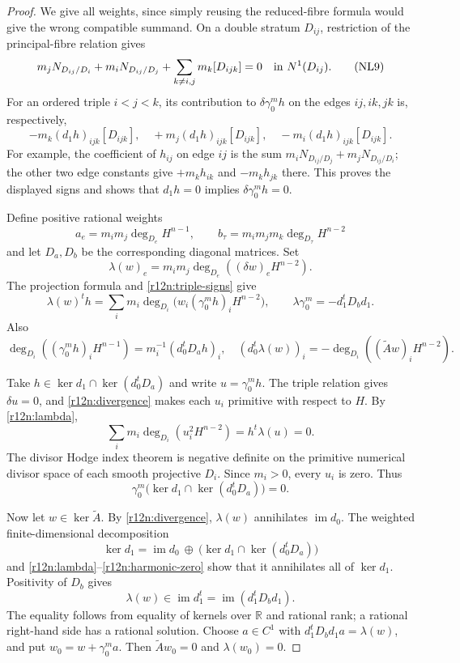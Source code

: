\begin{proof}
We give all weights, since simply reusing the reduced-fibre formula
would give the wrong compatible summand.  On a double stratum $D_{ij}$,
restriction of the principal-fibre relation gives
\[
 m_jN_{D_{ij}/D_i}+m_iN_{D_{ij}/D_j}
                  +\sum_{k\ne i,j}m_k[D_{ijk}]=0
                  \quad\hbox{in }N^1(D_{ij}).
\tag{NL9}\label{r12n:double-normal}
\]
For an ordered triple $i<j<k$, its contribution to
$\delta\gamma_0^m h$ on the edges $ij,ik,jk$ is, respectively,
\[
        -m_k(d_1h)_{ijk}[D_{ijk}],\quad
        +m_j(d_1h)_{ijk}[D_{ijk}],\quad
        -m_i(d_1h)_{ijk}[D_{ijk}].
\tag{NL10}\label{r12n:triple-signs}
\]
For example, the coefficient of $h_{ij}$ on edge $ij$ is the sum
$m_iN_{D_{ij}/D_j}+m_jN_{D_{ij}/D_i}$; the other two edge constants
give $+m_kh_{ik}$ and $-m_kh_{jk}$ there.  This proves the displayed
signs and shows that $d_1h=0$ implies $\delta\gamma_0^m h=0$.

Define positive rational weights
\[
 a_e=m_im_j\deg_{D_e}H^{n-1},\qquad
 b_\tau=m_im_jm_k\deg_{D_\tau}H^{n-2}
\]
and let $D_a,D_b$ be the corresponding diagonal matrices.  Set
\[
 \lambda(w)_e=m_im_j\deg_{D_e}((\delta w)_eH^{n-2}).
\]
The projection formula and \eqref{r12n:triple-signs} give
\[
 \lambda(w)^th
       =\sum_i m_i\deg_{D_i}\bigl(w_i(\gamma_0^m h)_iH^{n-2}\bigr),
 \qquad \lambda\gamma_0^m=-d_1^tD_bd_1.
\tag{NL11}\label{r12n:lambda}
\]
Also
\[
 \deg_{D_i}((\gamma_0^m h)_iH^{n-1})
                  =m_i^{-1}(d_0^tD_ah)_i,
 \quad
 (d_0^t\lambda(w))_i
                  =-\deg_{D_i}((\widetilde Aw)_iH^{n-2}).
\tag{NL12}\label{r12n:divergence}
\]

Take $h\in\ker d_1\cap\ker(d_0^tD_a)$ and write
$u=\gamma_0^m h$.  The triple relation gives $\delta u=0$, and
\eqref{r12n:divergence} makes each $u_i$ primitive with respect to
$H$.  By \eqref{r12n:lambda},
\[
             \sum_i m_i\deg_{D_i}(u_i^2H^{n-2})
                       =h^t\lambda(u)=0.
\]
The divisor Hodge index theorem is negative definite on the primitive
numerical divisor space of each smooth projective $D_i$.  Since
$m_i>0$, every $u_i$ is zero.  Thus
\[
       \gamma_0^m\bigl(\ker d_1\cap\ker(d_0^tD_a)\bigr)=0.
\tag{NL13}\label{r12n:harmonic-zero}
\]

Now let $w\in\ker\widetilde A$.  By
\eqref{r12n:divergence}, $\lambda(w)$ annihilates $\operatorname{im}d_0$.
The weighted finite-dimensional decomposition
\[
 \ker d_1=\operatorname{im}d_0\ \oplus\
           \bigl(\ker d_1\cap\ker(d_0^tD_a)\bigr)
\]
and \eqref{r12n:lambda}--\eqref{r12n:harmonic-zero} show that it
annihilates all of $\ker d_1$.  Positivity of $D_b$ gives
\[
 \lambda(w)\in\operatorname{im}d_1^t
                      =\operatorname{im}(d_1^tD_bd_1).
\]
The equality follows from equality of kernels over $\mathbb R$ and
rational rank; a rational right-hand side has a rational solution.
Choose $a\in C^1$ with $d_1^tD_bd_1a=\lambda(w)$, and put
$w_0=w+\gamma_0^m a$.  Then
$\widetilde Aw_0=0$ and $\lambda(w_0)=0$.


\end{proof}
